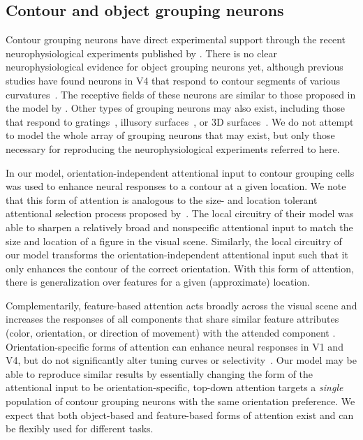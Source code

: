{\subsection{Contour and object grouping neurons}
Contour grouping neurons have direct
experimental support through the recent neurophysiological experiments
published by \cite{Chen_etal14}. 
There is no clear neurophysiological evidence for object
grouping neurons yet,
although previous studies have found neurons in V4 
that respond to contour segments
of various curvatures~\citep{Pasupathy_Connor02,Brincat_Connor04}. The receptive fields of these neurons are
similar to those proposed in the model by
\cite{Craft_etal07}. Other types of grouping neurons may also exist,
including those that respond to 
gratings~\citep{Hegde_vanEssen07}, illusory
surfaces~\citep{Cox_etal13}, or 3D
surfaces~\citep{He_Nakayama95,Hu_etal15a}.
We do not attempt to model the whole array of grouping neurons that may exist, but
only those necessary for reproducing the 
neurophysiological experiments referred to here. 

In our model, orientation-independent attentional input to contour
grouping cells was used to enhance neural responses to a contour at
a given location.
We note that this form of attention is analogous to the
size- and location tolerant attentional selection process
proposed by~\cite{Mihalas_etal11b}. The
local circuitry of their model was able to sharpen a relatively broad
and nonspecific attentional input to match the size and location of a
figure in the visual scene. Similarly, the local circuitry of our
model transforms the orientation-independent attentional input such
that it only enhances the contour of the correct orientation. With
this form of attention, there is generalization over features for a
given (approximate) location.

Complementarily, feature-based attention acts broadly across the
visual scene and increases the responses of all components that share
similar feature attributes (\eg color, orientation, or direction of
movement) with the attended
component \citep{Motter94a,Treue_Trujillo99}.
Orientation-specific forms of attention
can enhance neural
responses in V1 and V4, but do not significantly alter
tuning curves or selectivity~\citep{McAdams_Maunsell99a}. 
Our model may be able to reproduce similar results by essentially changing the
form of the attentional input to be orientation-specific, \ie top-down
attention targets a \emph{single} population of contour grouping
neurons with the same orientation preference.
We expect that both
object-based and feature-based forms of attention exist and can be
flexibly used for different tasks.

}
